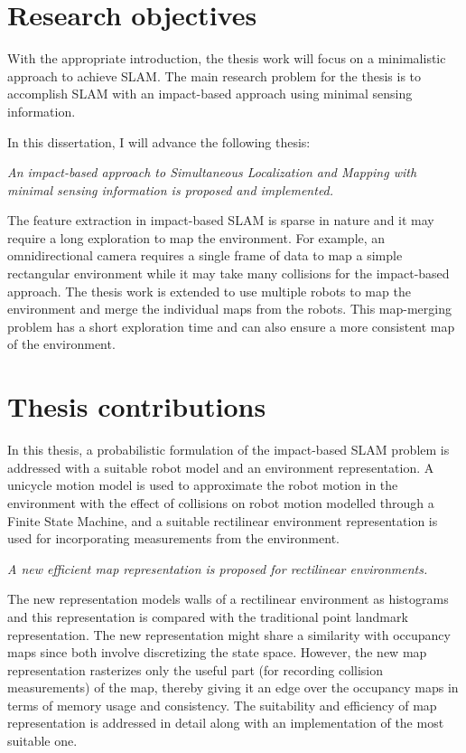 \section{Research objectives} \label{sec::thesis_statement}
With the appropriate introduction, the thesis work will focus on a minimalistic approach to achieve \acl{SLAM}. The main research problem for the thesis is to accomplish SLAM with an impact-based approach using minimal sensing information. 

In this dissertation, I will advance the following thesis:
\begin{center}
\noindent\parbox{0.9\textwidth}{\it An impact-based approach to Simultaneous Localization and Mapping with minimal sensing information is proposed and implemented.}
\end{center}

The feature extraction in impact-based SLAM is sparse in nature and it may require a long exploration to map the environment. For example, an omnidirectional camera requires a single frame of data to map a simple rectangular environment while it may take many collisions for the impact-based approach. The thesis work is extended to use multiple robots to map the environment and merge the individual maps from the robots. This map-merging problem has a short exploration time and can also ensure a more consistent map of the environment.

\section{Thesis contributions} \label{sec::thesis_contributions}
In this thesis, a probabilistic formulation of the impact-based SLAM problem is addressed with a suitable robot model and an environment representation. A unicycle motion model is used to approximate the robot motion in the environment with the effect of collisions on robot motion modelled through a Finite State Machine, and a suitable rectilinear environment representation is used for incorporating measurements from the environment. 

\begin{center}
{\it A new efficient map representation is proposed for rectilinear environments.}
\end{center}

The new representation models walls of a rectilinear environment as histograms and this representation is compared with the traditional point landmark representation. The new representation might share a similarity with occupancy maps since both involve discretizing the state space. However, the new map representation rasterizes only the useful part (for recording collision measurements) of the map, thereby giving it an edge over the occupancy maps in terms of memory usage and consistency. The suitability and efficiency of map representation is addressed in detail along with an implementation of the most suitable one.

